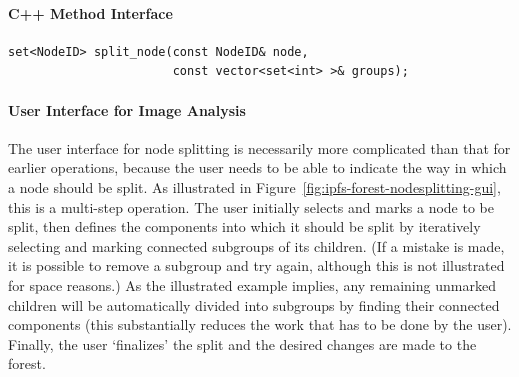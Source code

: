 \paragraph{C++ Method Interface}

\begin{lstlisting}[style=Prototype]
set<NodeID> split_node(const NodeID& node,
                       const vector<set<int> >& groups);
\end{lstlisting}

\paragraph{User Interface for Image Analysis}

The user interface for node splitting is necessarily more complicated than that for earlier operations, because the user needs to be able to indicate the way in which a node should be split. As illustrated in Figure~\ref{fig:ipfs-forest-nodesplitting-gui}, this is a multi-step operation. The user initially selects and marks a node to be split, then defines the components into which it should be split by iteratively selecting and marking connected subgroups of its children. (If a mistake is made, it is possible to remove a subgroup and try again, although this is not illustrated for space reasons.) As the illustrated example implies, any remaining unmarked children will be automatically divided into subgroups by finding their connected components (this substantially reduces the work that has to be done by the user). Finally, the user `finalizes' the split and the desired changes are made to the forest.


